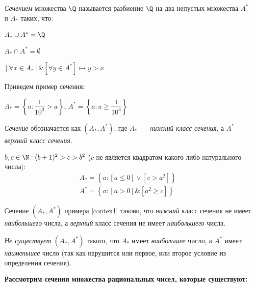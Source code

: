 
\begin{definition}
\textit{Сечением} множества \(\Q\) называется разбиение \(\Q\) на два непустых множества
\(A^*\) и \(A_*\) таких, что:
\begin{properties}
\item \(A_* \cup A^* = \Q\)
\item \(A_* \cap A^* = \emptyset\)
\item \(\left[\forall x \in A_*\right] \& \left[\forall y \in A^*\right] \mapsto
    y > x\)
\end{properties}
\end{definition}

\begin{example} Приведем пример сечения:

\(A_* =  \left\{a \colon \dfrac{1}{10^3} > a\right\}\),
\(A^* = \left\{a \colon a \geq \dfrac{1}{10^3}\right\}\)
\end{example}

\textit{Сечение} обозначается как \(\left(A_*, A^*\right)\), где \(A_*\)~---
\textit{нижний класс сечения}, а \(A^*\)~--- \textit{верхний класс сечения}.

\begin{example}
\label{contex1}
\(b, c \in \N : (b + 1)^2 > c > b^2\) (\(c\) не является квадратом какого-либо
натурального числа):
\begin{gather}
A_* = \left\{a : \left[a \leq 0\right] \lor \left[c > a^2\right]\right\} \\
A^* = \left\{a : \left[a > 0\right] \& \left[a^2 \geq c\right]\right\}
\end{gather}
\end{example}

\begin{proposition}
Сечение \(\left(A_*, A^*\right)\) примера \ref{contex1} таково, что \textit{нижний} класс сечения не имеет
\textit{наибольшего} числа, а \textit{верхний} класс сечения не имеет \textit{наибольшего} числа.
\end{proposition}

\begin{proposition}
\textit{Не существует} \(\left(A_*, A^*\right)\) такого, что \(A_*\) имеет \textit{наибольшее} число,
а \(A^*\) имеет \textit{наименьшее} число (так как нарушится или первое, или второе условие из
определения сечения).
\end{proposition}

\textbf{Рассмотрим сечения множества рациональных чисел, которые существуют:}

